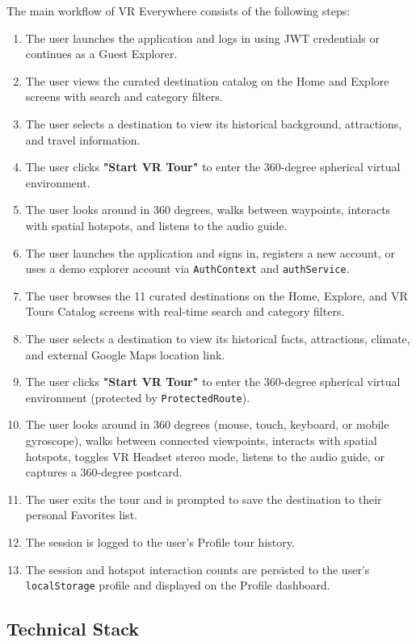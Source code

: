 \documentclass{tietreport}
\begin{document}
The main workflow of VR Everywhere consists of the following steps:

\begin{enumerate}
  \item The user launches the application and logs in using JWT credentials or continues as a Guest Explorer.
  \item The user views the curated destination catalog on the Home and Explore screens with search and category filters.
  \item The user selects a destination to view its historical background, attractions, and travel information.
  \item The user clicks \textbf{"Start VR Tour"} to enter the 360-degree spherical virtual environment.
  \item The user looks around in 360 degrees, walks between waypoints, interacts with spatial hotspots, and listens to the audio guide.
  \item The user launches the application and signs in, registers a new account, or uses a demo explorer account via \texttt{AuthContext} and \texttt{authService}.
  \item The user browses the 11 curated destinations on the Home, Explore, and VR Tours Catalog screens with real-time search and category filters.
  \item The user selects a destination to view its historical facts, attractions, climate, and external Google Maps location link.
  \item The user clicks \textbf{"Start VR Tour"} to enter the 360-degree spherical virtual environment (protected by \texttt{ProtectedRoute}).
  \item The user looks around in 360 degrees (mouse, touch, keyboard, or mobile gyroscope), walks between connected viewpoints, interacts with spatial hotspots, toggles VR Headset stereo mode, listens to the audio guide, or captures a 360-degree postcard.
  \item The user exits the tour and is prompted to save the destination to their personal Favorites list.
  \item The session is logged to the user's Profile tour history.
  \item The session and hotspot interaction counts are persisted to the user's \texttt{localStorage} profile and displayed on the Profile dashboard.
\end{enumerate}

\subsection{Technical Stack}
\end{document}
